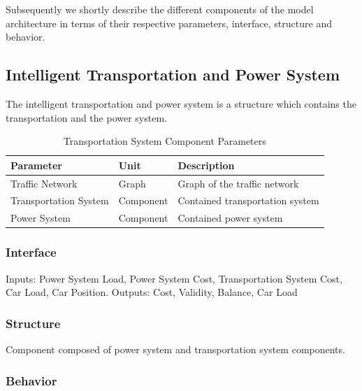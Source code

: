 Subsequently we shortly describe the different components of the model architecture in terms of their respective parameters, interface, structure and behavior.

\subsection{Intelligent Transportation and Power System}

The intelligent transportation and power system is a structure which contains the transportation and the power system.

\begin{table}[h]
	\renewcommand{\arraystretch}{1.3}
	\caption{Transportation System Component Parameters}
	\centering
	\begin{tabular}{lll}
		\hline
		\textbf{Parameter}                    & \textbf{Unit} & \textbf{Description} \\ \hline
		Traffic Network                  	  & Graph          & Graph of the traffic network      \\
		Transportation System                 & Component    & Contained transportation system    \\ 
		Power System                 		  & Component   & Contained power system    \\ \hline
	\end{tabular}
\end{table}

\subsubsection{Interface}

Inputs: Power System Load, Power System Cost, Transportation System Cost, Car Load, Car Position. Outputs: Cost, Validity, Balance, Car Load

\subsubsection{Structure}

Component composed of power system and transportation system components.

\subsubsection{Behavior}

